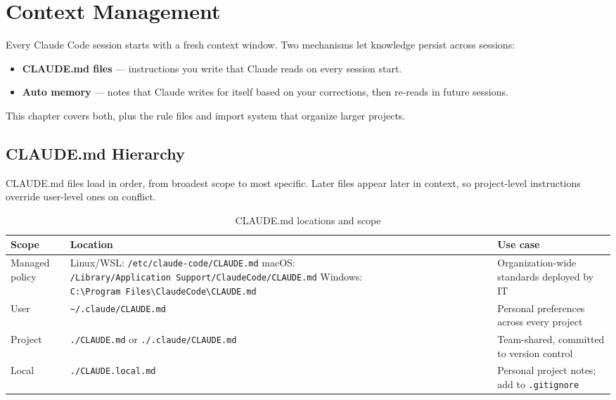 \chapter{Context Management}
\label{ch:context}


Every Claude Code session starts with a fresh context window. Two mechanisms
let knowledge persist across sessions:

\begin{itemize}
  \item \textbf{CLAUDE.md files} — instructions you write that Claude reads on
        every session start.
  \item \textbf{Auto memory} — notes that Claude writes for itself based on
        your corrections, then re-reads in future sessions.
\end{itemize}

This chapter covers both, plus the rule files and import system that organize
larger projects.

\section{CLAUDE.md Hierarchy}
\label{sec:claude-md-scopes}


CLAUDE.md files load in order, from broadest scope to most specific. Later
files appear later in context, so project-level instructions override
user-level ones on conflict.

\begin{table}[ht]
\centering
\caption{CLAUDE.md locations and scope}
\label{tab:claude-md-scopes}
\small
\begin{tabularx}{\textwidth}{l>{\raggedright\arraybackslash}XX}
\toprule
\textbf{Scope} & \textbf{Location} & \textbf{Use case} \\
\midrule
Managed policy & Linux/WSL: \texttt{/etc/claude-code/CLAUDE.md} \newline
                 macOS: \texttt{/Library/Application\allowbreak\ Support/Claude\allowbreak Code/CLAUDE.md} \newline
                 Windows: \texttt{C:\textbackslash{}Program\allowbreak\ Files\textbackslash{}Claude\allowbreak Code\textbackslash{}CLAUDE.md}
               & Organization-wide standards deployed by IT \\
User           & \texttt{\textasciitilde/.claude/CLAUDE.md}
               & Personal preferences across every project \\
Project        & \texttt{./CLAUDE.md} or \texttt{./.claude/CLAUDE.md}
               & Team-shared, committed to version control \\
Local          & \texttt{./CLAUDE.local.md}
               & Personal project notes; add to \texttt{.gitignore} \\
\bottomrule
\end{tabularx}
\end{table}

